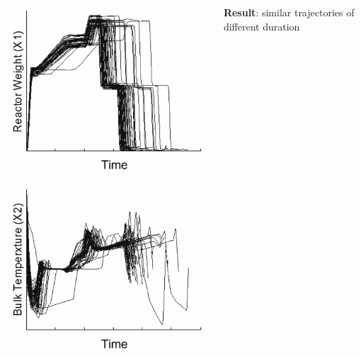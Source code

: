 \begin{frame}
\begin{columns}
		\begin{center}
			\includegraphics[width=\textwidth]{images/unaligned-trajectories-many-batches.png}
		\end{center}

		\small
		\textbf{Result}: similar trajectories of different duration
\end{columns}
\end{frame}

